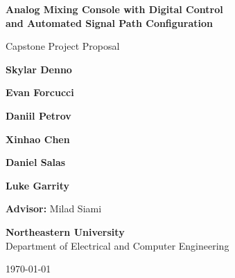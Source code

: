 \documentclass[11pt, letterpaper,titlepage]{article}
\begin{document}
\begin{titlepage}
    \centering
    \vspace*{0cm}
    
    {\huge \textbf{Analog Mixing Console with Digital Control\\ \vspace{0.5cm}and Automated Signal Path Configuration}} \\[1cm]
    
    \vspace{0.5cm}
    
    {\huge Capstone Project Proposal}
    
    \vspace{5cm}
    




    
    {\Large \textbf{Skylar Denno}}
    
    \vspace{0.3cm}
    
    {\Large \textbf{Evan Forcucci}}
    
        \vspace{0.3cm}
    
    {\Large \textbf{Daniil Petrov}}
    
        \vspace{0.3cm}
    
    {\Large \textbf{Xinhao Chen}}
    
        \vspace{0.3cm}
    
    {\Large \textbf{Daniel Salas}}
    
        \vspace{0.3cm}
    
    {\Large \textbf{Luke Garrity}}
    

    
    \vspace{0.5cm}
    
        {\large \textbf{Advisor: }Milad Siami }
    
        \vspace{1.3cm}

    
        {\LARGE \textbf{Northeastern University}} \\
        
    Department of Electrical and Computer Engineering \\
    \vspace{1cm}
    
    
    \today

\end{titlepage}
\setlength{\parindent}{6pt}
\end{document}
